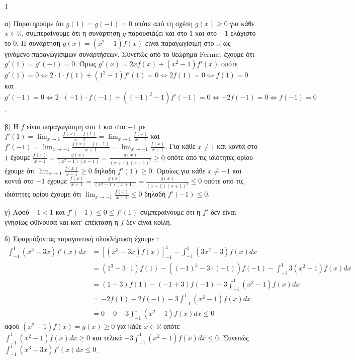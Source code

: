 \begin{ylh}{1}
    \item [Ύλη από εικόνα]
\end{ylh}
\begin{alist}
\item α) Παρατηρούμε ότι $g(1)=g(-1)=0$ οπότε από τη σχέση $g(x) \geq 0$ για κάθε $x \in \mathbb{R}$, συμπεραίνουμε ότι η συνάρτηση $g$ παρουσιάζει και στο $1$ και στο $-1$ ελάχιστο το $0$.
Η συνάρτηση $g(x)=(x^2-1)f(x)$ είναι παραγωγίσιμη στο $\mathbb{R}$ ως γινόμενο παραγωγίσιμων συναρτήσεων. Συνεπώς από το θεώρημα Fermat έχουμε ότι $g'(1)=g'(-1)=0$. Όμως $g'(x)=2xf(x)+(x^2-1)f'(x)$ οπότε $g'(1)=0 \Leftrightarrow 2 \cdot 1 \cdot f(1)+(1^2-1)f'(1)=0 \Leftrightarrow 2f(1)=0 \Leftrightarrow f(1)=0$ και $g'(-1)=0 \Leftrightarrow 2 \cdot (-1) \cdot f(-1)+((-1)^2-1)f'(-1)=0 \Leftrightarrow -2f(-1)=0 \Leftrightarrow f(-1)=0$.

\item β) Η $f$ είναι παραγωγίσιμη στο $1$ και στο $-1$ με $f'(1)=\lim_{x \to 1} \frac{f(x)-f(1)}{x-1}=\lim_{x \to 1} \frac{f(x)}{x-1}$ και $f'(-1)=\lim_{x \to -1} \frac{f(x)-f(-1)}{x+1}=\lim_{x \to -1} \frac{f(x)}{x+1}$.
Για κάθε $x \neq 1$ και κοντά στο $1$ έχουμε $\frac{f(x)}{x-1}=\frac{g(x)}{(x^2-1)(x-1)}=\frac{g(x)}{(x+1)(x-1)^2} \geq 0$ οπότε από τις ιδιότητες ορίου έχουμε ότι $\lim_{x \to 1} \frac{f(x)}{x-1} \geq 0$ δηλαδή $f'(1) \geq 0$.
Ομοίως για κάθε $x \neq -1$ και κοντά στο $-1$ έχουμε $\frac{f(x)}{x+1}=\frac{g(x)}{(x^2-1)(x+1)}=\frac{g(x)}{(x-1)(x+1)^2} \leq 0$ οπότε από τις ιδιότητες ορίου έχουμε ότι $\lim_{x \to -1} \frac{f(x)}{x+1} \leq 0$ δηλαδή $f'(-1) \leq 0$.

\item γ) Αφού $-1<1$ και $f'(-1) \leq 0 \leq f'(1)$ συμπεραίνουμε ότι η $f'$ δεν είναι γνησίως φθίνουσα και κατ' επέκταση η $f$ δεν είναι κοίλη.

\item δ) Εφαρμόζοντας παραγοντική ολοκλήρωση έχουμε :
\begin{align*}
\int_{-1}^{1} (x^3-3x)f'(x)dx &= [(x^3-3x)f(x)]_{-1}^{1} - \int_{-1}^{1} (3x^2-3)f(x)dx \\
&= (1^3-3 \cdot 1)f(1) - ((-1)^3-3 \cdot (-1))f(-1) - \int_{-1}^{1} 3(x^2-1)f(x)dx \\
&= (1-3)f(1) - (-1+3)f(-1) - 3\int_{-1}^{1} (x^2-1)f(x)dx \\
&= -2f(1) - 2f(-1) - 3\int_{-1}^{1} (x^2-1)f(x)dx \\
&= 0-0-3\int_{-1}^{1} (x^2-1)f(x)dx \leq 0
\end{align*}
αφού $(x^2-1)f(x)=g(x) \geq 0$ για κάθε $x \in \mathbb{R}$ οπότε $\int_{-1}^{1} (x^2-1)f(x)dx \geq 0$ και τελικά $-3\int_{-1}^{1} (x^2-1)f(x)dx \leq 0$. Συνεπώς $\int_{-1}^{1} (x^3-3x)f'(x)dx \leq 0$.
\end{alist}
